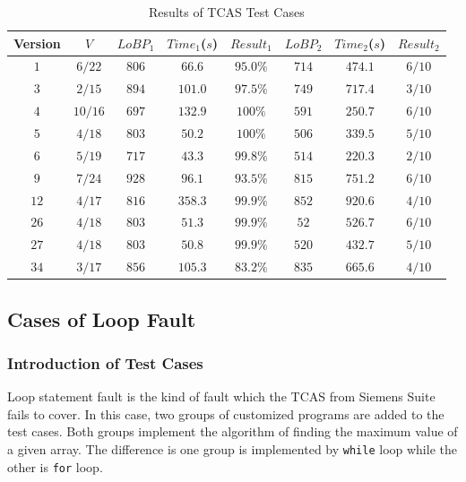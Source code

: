 \documentclass[10pt,journal,final,]{article}
\theoremstyle{definition}
\begin{document}
\begin{table}
\small
\center
\caption{Results of TCAS Test Cases}
\label{table:RoTCASTC}
\begin{tabular}{|c|c|c|c|c|c|c|c|}
\hline
Version & $V$     & $LoBP_{1}$ & $Time_{1}$($s$) & $Result_{1}$ &$LoBP_{2}$ & $Time_{2}$($s$) & $Result_{2}$ \\
\hline
$1$     & $6/22$  & $806$      & $66.6$          & $95.0\%$     & $714$     & $474.1$         & $6/10$       \\
\hline
$3$     & $2/15$  & $894$      & $101.0$         & $97.5\%$     & $749$     & $717.4$         & $3/10$       \\
\hline
$4$	    & $10/16$ & $697$      & $132.9$         & $100\%$      & $591$     & $250.7$         & $6/10$       \\
\hline
$5$	    & $4/18$  & $803$      & $50.2$          & $100\%$      & $506$     & $339.5$         & $5/10$       \\
\hline
$6$	    & $5/19$  & $717$      & $43.3$          & $99.8\%$     & $514$     & $220.3$         & $2/10$       \\
\hline
$9$	    & $7/24$  & $928$      & $96.1$          & $93.5\%$     & $815$     & $751.2$         & $6/10$       \\
\hline
$12$    & $4/17$  & $816$      & $358.3$         & $99.9\%$     & $852$     & $920.6$         & $4/10$       \\
\hline
$26$    & $4/18$  & $803$      & $51.3$          & $99.9\%$     & $52$      & $526.7$         & $6/10$       \\
\hline
$27$    & $4/18$  & $803$      & $50.8$          & $99.9\%$     & $520$     & $432.7$         & $5/10$       \\
\hline
$34$    & $3/17$  & $856$      & $105.3$         & $83.2\%$     & $835$     & $665.6$         & $4/10$       \\
\hline
\end{tabular}
\end{table}

\subsection{Cases of Loop Fault}
\subsubsection{Introduction of Test Cases}
Loop statement fault is the kind of fault which the TCAS from Siemens Suite fails to cover.
In this case, two groups of customized programs are added to the test cases. Both groups implement the algorithm of finding the maximum value of a given array.
The difference is one group is implemented by \lstinline|while| loop while the other is \lstinline|for| loop.
\end{document}
